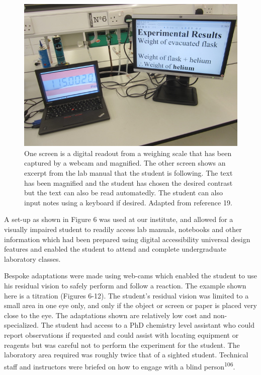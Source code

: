 \documentclass[11.5pt]{sig-alternate} %
\begin{document}
\begin{large}
\begin{figure}[htbp]
    \centering
    \includegraphics[width=0.95\columnwidth]{images/fig6.png}
    \caption{One screen is a digital readout from a weighing scale that has been captured by a webcam and magnified. The other screen shows an excerpt from the lab manual that the student is following. The text has been magnified and the student has chosen the desired contrast but the text can also be read automatedly. The student can also input notes using a keyboard if desired. Adapted from reference 19.}
    \label{Figure 6}
\end{figure}

A set-up as shown in Figure 6 was used at our institute, and allowed for a visually impaired student to readily access lab manuals, notebooks and other information which had been prepared using digital accessibility universal design features and enabled the student to attend and complete undergraduate laboratory classes.

Bespoke adaptations were made using web-cams which enabled the student to use his residual vision to safely perform and follow a reaction. The example shown here is a titration (Figures 6-12). The student’s residual vision was limited to a small area in one eye only, and only if the object or screen or paper is placed very close to the eye. The adaptations shown are relatively low cost and non-specialized. The student had access to a PhD chemistry level assistant who could report observations if requested and could assist with locating equipment or reagents but was careful not to perform the experiment for the student. The laboratory area required was roughly twice that of a sighted student. Technical staff and instructors were briefed on how to engage with a blind person\textsuperscript{106}.


\end{large}
\end{document}
